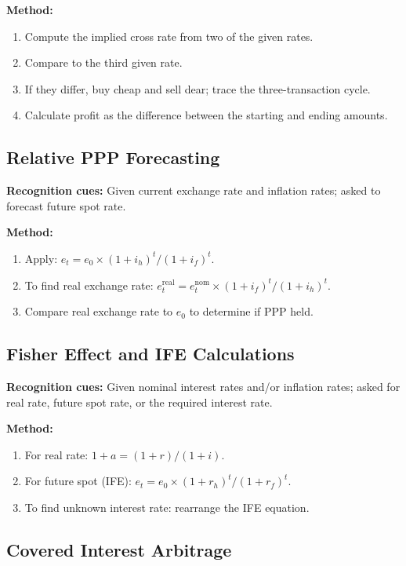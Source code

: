 \documentclass[11pt,a4paper]{article}
\begin{document}
\textbf{Method:}
\begin{enumerate}
  \item Compute the implied cross rate from two of the given rates.
  \item Compare to the third given rate.
  \item If they differ, buy cheap and sell dear; trace the three-transaction cycle.
  \item Calculate profit as the difference between the starting and ending amounts.
\end{enumerate}

\subsection{Relative PPP Forecasting}

\textbf{Recognition cues:} Given current exchange rate and inflation rates; asked to forecast future spot rate.

\textbf{Method:}
\begin{enumerate}
  \item Apply: $e_t = e_0 \times (1+i_h)^t/(1+i_f)^t$.
  \item To find real exchange rate: $e_t^{\text{real}} = e_t^{\text{nom}} \times (1+i_f)^t/(1+i_h)^t$.
  \item Compare real exchange rate to $e_0$ to determine if PPP held.
\end{enumerate}

\subsection{Fisher Effect and IFE Calculations}

\textbf{Recognition cues:} Given nominal interest rates and/or inflation rates; asked for real rate, future spot rate, or the required interest rate.

\textbf{Method:}
\begin{enumerate}
  \item For real rate: $1 + a = (1+r)/(1+i)$.
  \item For future spot (IFE): $e_t = e_0 \times (1+r_h)^t/(1+r_f)^t$.
  \item To find unknown interest rate: rearrange the IFE equation.
\end{enumerate}

\subsection{Covered Interest Arbitrage}
\end{document}
